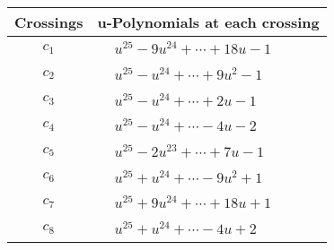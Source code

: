 \documentclass[1p]{elsarticle_modified}
\theoremstyle{definition}
\begin{document}
\begin{tabular}{m{50pt}|m{274pt}}
Crossings & \hspace{64pt}u-Polynomials at each crossing \\
\hline $$\begin{aligned}c_{1}\end{aligned}$$&$\begin{aligned}
&u^{25}-9 u^{24}+\cdots+18 u-1
\end{aligned}$\\
\hline $$\begin{aligned}c_{2}\end{aligned}$$&$\begin{aligned}
&u^{25}- u^{24}+\cdots+9 u^2-1
\end{aligned}$\\
\hline $$\begin{aligned}c_{3}\end{aligned}$$&$\begin{aligned}
&u^{25}- u^{24}+\cdots+2 u-1
\end{aligned}$\\
\hline $$\begin{aligned}c_{4}\end{aligned}$$&$\begin{aligned}
&u^{25}- u^{24}+\cdots-4 u-2
\end{aligned}$\\
\hline $$\begin{aligned}c_{5}\end{aligned}$$&$\begin{aligned}
&u^{25}-2 u^{23}+\cdots+7 u-1
\end{aligned}$\\
\hline $$\begin{aligned}c_{6}\end{aligned}$$&$\begin{aligned}
&u^{25}+u^{24}+\cdots-9 u^2+1
\end{aligned}$\\
\hline $$\begin{aligned}c_{7}\end{aligned}$$&$\begin{aligned}
&u^{25}+9 u^{24}+\cdots+18 u+1
\end{aligned}$\\
\hline $$\begin{aligned}c_{8}\end{aligned}$$&$\begin{aligned}
&u^{25}+u^{24}+\cdots-4 u+2
\end{aligned}$\\

\end{tabular}
\end{document}
